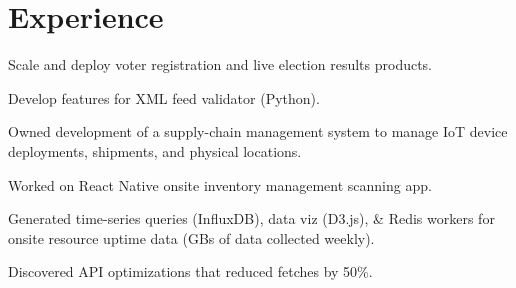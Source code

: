 \documentclass[]{deedy-resume-openfont}
\begin{document}
\begin{minipage}[t]{0.66\textwidth}


\section{Experience}
\sectionsep

\vspace{\topsep}
\begin{tightemize}

\item Scale and deploy voter registration and live election results products.
\item Develop features for XML feed validator (Python).

\end{tightemize}
\sectionsep

\vspace{\topsep}
\begin{tightemize}

\item Owned development of a supply-chain management system to manage IoT device deployments, shipments, and physical locations.
\item Worked on React Native onsite inventory management scanning app.
\item Generated time-series queries (InfluxDB), data viz (D3.js), \& Redis workers for onsite resource uptime data (GBs of data collected weekly).
\item Discovered API optimizations that reduced fetches by 50\%.

\end{tightemize}
\sectionsep


\begin{tightemize}




\end{tightemize}
\end{minipage}
\end{document}
